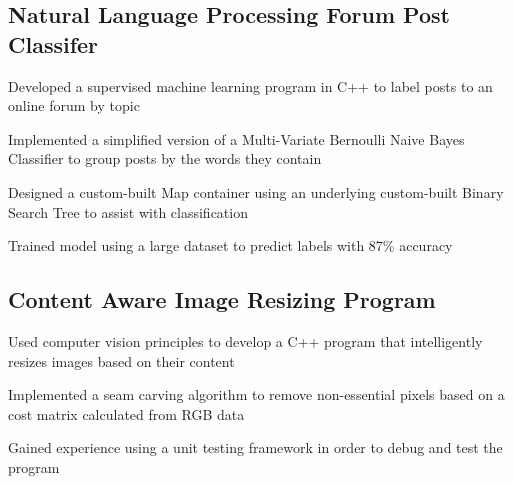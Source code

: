 \documentclass[letter,10pt]{article}
\begin{document}
\subsection{{Natural Language Processing Forum Post Classifer}}
\begin{zitemize}
\item Developed a supervised machine learning program in C++ to label posts to an online forum by topic
\item Implemented a simplified version of a Multi-Variate Bernoulli Naive Bayes Classifier to group posts by the words they contain
\item Designed a custom-built Map container using an underlying custom-built Binary Search Tree to assist with classification
\item Trained model using a large dataset to predict labels with 87\% accuracy
\end{zitemize}

\subsection{{Content Aware Image Resizing Program }}
\begin{zitemize}
\item Used computer vision principles to develop a C++ program that intelligently resizes images based on their content
\item Implemented a seam carving algorithm to remove non-essential pixels based on a cost matrix calculated from RGB data
\item Gained experience using a unit testing framework in order to debug and test the program
\end{zitemize}



\end{document}
